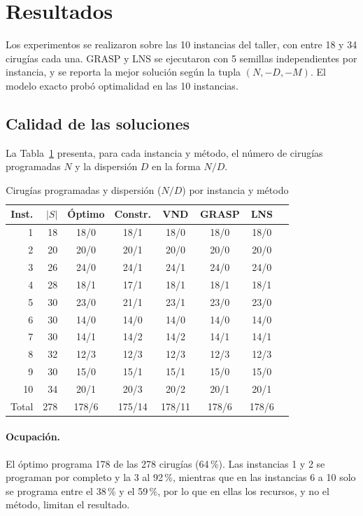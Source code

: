 \section{Resultados}
\label{sec:results}


Los experimentos se realizaron sobre las 10 instancias del taller, con entre 18 y 34 cirugías cada una. GRASP y LNS se ejecutaron con 5 semillas independientes por instancia, y se reporta la mejor solución según la tupla $(N,-D,-M)$. El modelo exacto probó optimalidad en las 10 instancias.

\subsection{Calidad de las soluciones}

La Tabla~\ref{tab:calidad} presenta, para cada instancia y método, el número de cirugías programadas $N$ y la dispersión $D$ en la forma $N/D$.

\begin{table}[t]
	\caption{Cirugías programadas y dispersión ($N/D$) por instancia y método}
	\label{tab:calidad}
	\centering
	\footnotesize
	\setlength{\tabcolsep}{3.5pt}
	\begin{tabular}{@{}rrcccccc@{}}
		\hline
		Inst. & $|S|$ & Óptimo & Constr. & VND & GRASP & LNS \\
		\hline
		1  & 18 & 18/0 & 18/1 & 18/0 & 18/0 & 18/0 \\
		2  & 20 & 20/0 & 20/1 & 20/0 & 20/0 & 20/0 \\
		3  & 26 & 24/0 & 24/1 & 24/1 & 24/0 & 24/0 \\
		4  & 28 & 18/1 & 17/1 & 18/1 & 18/1 & 18/1 \\
		5  & 30 & 23/0 & 21/1 & 23/1 & 23/0 & 23/0 \\
		6  & 30 & 14/0 & 14/0 & 14/0 & 14/0 & 14/0 \\
		7  & 30 & 14/1 & 14/2 & 14/2 & 14/1 & 14/1 \\
		8  & 32 & 12/3 & 12/3 & 12/3 & 12/3 & 12/3 \\
		9  & 30 & 15/0 & 15/1 & 15/1 & 15/0 & 15/0 \\
		10 & 34 & 20/1 & 20/3 & 20/2 & 20/1 & 20/1 \\
		\hline
		Total & 278 & 178/6 & 175/14 & 178/11 & 178/6 & 178/6 \\
		\hline
	\end{tabular}
\end{table}

\paragraph*{Ocupación.} El óptimo programa 178 de las 278 cirugías (64\,\%). Las instancias 1 y 2 se programan por completo y la 3 al 92\,\%, mientras que en las instancias 6 a 10 solo se programa entre el 38\,\% y el 59\,\%, por lo que en ellas los recursos, y no el método, limitan el resultado.

